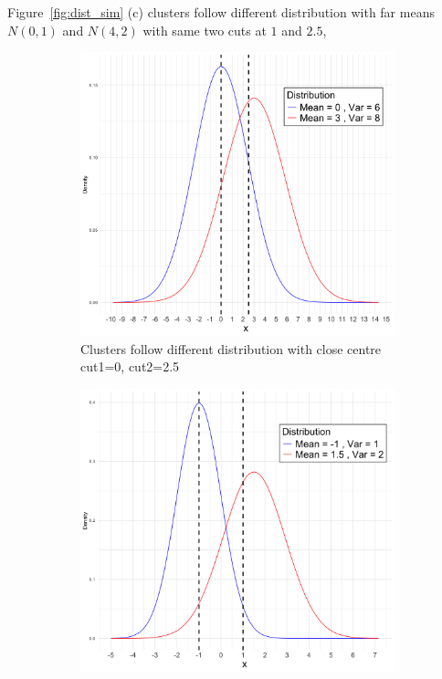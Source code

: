 \documentclass{article}
\begin{document}
Figure~\ref*{fig:dist_sim} (c) clusters follow different distribution with far means $N(0,1)$ and $N(4,2)$
with same two cuts at $1$ and $2.5$,

\begin{figure}[htbp!]
  \centering
  \begin{subfigure}{0.32\textwidth}  %
    \centering
    \includegraphics[width=\textwidth]{images/dist_simu/norm_dist_close.png} %
    \caption{Clusters follow different distribution with close centre\\ cut1=0, cut2=2.5}
\end{subfigure}
  \hfill
  \begin{subfigure}{0.32\textwidth}  %
    \centering
    \includegraphics[width=\textwidth]{images/dist_simu/norm_dist_medium.png} %

\end{subfigure}
\end{figure}
\end{document}
